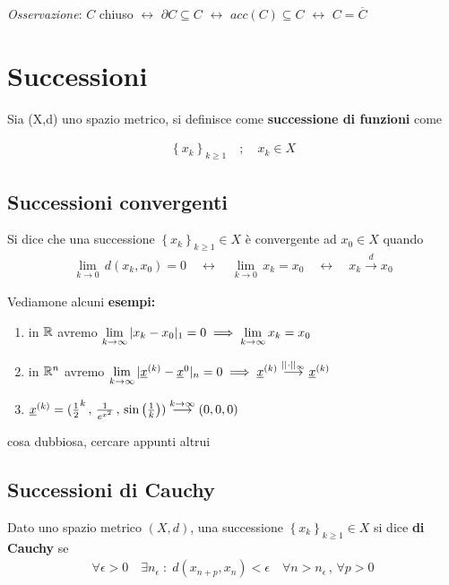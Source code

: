 \textit{Osservazione}: $C$ chiuso $\leftrightarrow$ $\partial C \subseteq C$ $\leftrightarrow$ $acc(C) \subseteq C$ $\leftrightarrow$ $C= \overline{C}$

\newpage


\section{Successioni}

Sia (X,d) uno spazio metrico, si definisce come \textbf{successione di funzioni} come

\begin{align}
\left\{ x_k \right\}_{k\geq 1} \quad ; \quad x_k \in X
\end{align}

\subsection{Successioni convergenti}

Si dice che una successione $\left\{ x_k \right\}_{k\geq 1}\in X$ è convergente ad $x_0 \in X$ quando
\begin{align}
\underset{k\rightarrow 0}{\lim} \, d(x_k,x_0)=0 \quad \leftrightarrow \quad \underset{k\rightarrow 0}{\lim} \, x_k=x_0 \quad \leftrightarrow \quad x_k \overset{d}{\rightarrow} x_0
\end{align}

Vediamone alcuni \textbf{esempi:}

\begin{enumerate}
	\item in $\mathbb{R}$ avremo $\underset{k \rightarrow \infty}{\lim} \, |x_k - x_0|_1=0 \implies \underset{k \rightarrow \infty}{\lim} \,x_k=x_0$
	\item in $\mathbb{R}^n$ avremo $\underset{k \rightarrow \infty}{\lim} \, |\underline{x}^{(k)} - \underline{x}^{0}|_n=0 \implies \underline{x}^{(k)}\overset{||\cdot||_\infty}{\longrightarrow}\underline{x}^{(k)}$
	\item $\underline{x}^{(k)}=(\frac{1}{2}^k \, , \, \frac{1}{e^{x^2}} \, , \, \sin \left( \frac{1}{k} \right) ) \overset{k \rightarrow \infty}{\longrightarrow} (0,0,0) $
\end{enumerate}

cosa dubbiosa, cercare appunti altrui

\subsection{Successioni di Cauchy}

Dato uno spazio metrico $(X,d)$, una successione $\left\{ x_k \right\}_{k\geq 1}\in X$ si dice \textbf{di Cauchy} se
\begin{align}
\forall \epsilon > 0 \quad \exists n_\epsilon \; : \; d(x_{n+p},x_n)<\epsilon \quad \forall n>n_\epsilon \, , \, \forall p>0
\end{align}

